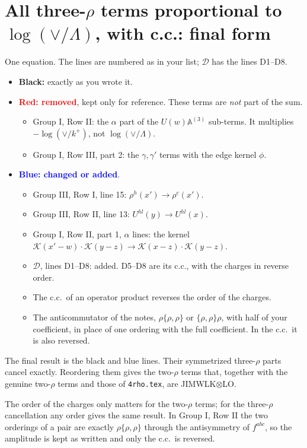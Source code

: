 \documentclass[9pt]{article}
\begin{document}
\section*{All three-$\rho$ terms proportional to $\log(\vee/\Lambda)$, with c.c.: final form}
One equation. The lines are numbered as in your list; $\mathcal D$ has the lines D1--D8.
\begin{itemize}
\item \textbf{Black:} exactly as you wrote it.
\item \textcolor{red}{\textbf{Red: removed}}, kept only for reference. These terms are \emph{not} part of the sum.
\begin{itemize}
\item[F4] Group I, Row II: the $\alpha$ part of the $U(w)\mathbb A^{(3)}$ sub-terms. It multiplies $-\log(\vee/k^+)$, not $\log(\vee/\Lambda)$.
\item[F3] Group I, Row III, part 2: the $\gamma,\gamma'$ terms with the edge kernel $\phi$.
\end{itemize}
\item \textcolor{blue}{\textbf{Blue: changed or added}}.
\begin{itemize}
\item[T1] Group III, Row I, line 15: $\rho^{h}(x')\to\rho^{c}(x')$.
\item[T2] Group III, Row II, line 13: $U^{hl}(y)\to U^{hl}(x)$.
\item[T3] Group I, Row II, part 1, $\alpha$ lines: the kernel $\mathcal K(x'-w)\cdot\mathcal K(y-z)\to\mathcal K(x-z)\cdot\mathcal K(y-z)$.
\item[F3] $\mathcal D$, lines D1--D8: added. D5--D8 are its c.c., with the charges in reverse order.
\item[c.c.] The c.c.\ of an operator product reverses the order of the charges.
\item[order] The anticommutator of the notes, $\rho\{\rho,\rho\}$ or $\{\rho,\rho\}\rho$, with half of your coefficient, in place of one ordering with the full coefficient. In the c.c.\ it is also reversed.
\end{itemize}
\end{itemize}
The final result is the black and blue lines. Their symmetrized three-$\rho$ parts cancel exactly. Reordering them gives the two-$\rho$ terms that, together with the genuine two-$\rho$ terms and those of \texttt{4rho.tex}, are JIMWLK$\otimes$LO.

The order of the charges only matters for the two-$\rho$ terms; for the three-$\rho$ cancellation any order gives the same result. In Group I, Row II the two orderings of a pair are exactly $\rho\{\rho,\rho\}$ through the antisymmetry of $f^{abc}$, so the amplitude is kept as written and only the c.c.\ is reversed.
\end{document}
